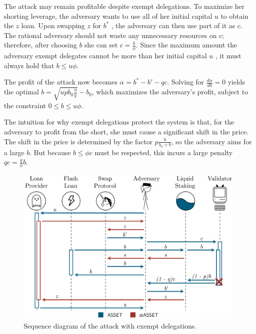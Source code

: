 The attack may remain profitable despite exempt delegations.
To maximize her shorting leverage, the adversary wants to use all
of her initial capital $u$ \asset to obtain the $z$ \stasset loan.
Upon swapping $z$ for $b^*$ \asset, the adversary can then use part of it as $c$.
The rational adversary should not waste any unnecessary resources on
$c$; therefore, after choosing $b$ she can set $c = \frac{b}{\phi}$.
Since the maximum amount the adversary exempt delegates
cannot be more than her initial capital $u$ \asset,
it must always hold that $b \leq u\phi$.

The profit of the attack now becomes $\alpha = b^* - b' - qc$.
Solving for $\frac{d\alpha}{db} = 0$ yields the optimal $b = \sqrt{u p b_0 \frac{\phi}{q}} - b_0$,
which maximizes
the adversary's profit, subject to the constraint
$0 \leq b \leq u\phi$.

The intuition for why exempt delegations protect the system is that,
for the adversary to profit from the short, she must cause a significant
shift in the price. The shift in the price is determined by the factor
$p\frac{b}{b_0 + b}$, so the adversary aims for a large $b$. But because $b \leq \phi c$
must be respected, this incurs a large penalty $qc = \frac{q}{\phi}b$.


\ifproceedings
\else
  \iflncs
    \begin{figure}[htb]
      \centering
      \includegraphics[width=1\textwidth]{./figures/sequence-diagram.pdf}
      \caption{Sequence diagram of the attack with exempt delegations.}
      \label{fig:exempt-sequence}
    \end{figure}
  \fi
\fi



